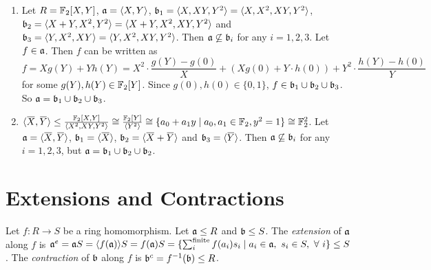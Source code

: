 \begin{example}
    \begin{enumerate}
        \item Let $R = \mathbb{F}_2[X,Y]$, $\mathfrak{a} = \langle X,Y \rangle$, $\mathfrak{b}_1 = \langle X,XY,Y^2 \rangle = \langle X,X^2,XY,Y^2 \rangle$, $\mathfrak{b}_2 = \langle X+Y,X^2,Y^2 \rangle = \langle X+Y,X^2,XY,Y^2 \rangle$ and $\mathfrak{b}_3 = \langle Y,X^2,XY \rangle = \langle Y,X^2,XY,Y^2 \rangle$. Then $\mathfrak{a} \not \subseteq \mathfrak{b}_i$ for any $i = 1,2,3$. Let $f \in \mathfrak{a}$. Then $f$ can be written as 
            \[f = X g(Y) + Y h(Y) = X^2 \cdot \frac{g(Y)-g(0)}{X} + (Xg(0)+Y \cdot h(0)) + Y^2 \cdot \frac{h(Y)-h(0)}{Y} \]
            for some $g(Y),h(Y) \in \mathbb{F}_2[Y]$. Since $g(0), h(0) \in \{0,1\}$, $f \in \mathfrak{b}_1 \cup \mathfrak{b}_2 \cup \mathfrak{b}_3$. So $\mathfrak{a} = \mathfrak{b}_1 \cup \mathfrak{b}_2 \cup \mathfrak{b}_3$.
        \item $ \langle \overbar X, \overbar Y \rangle \leq \frac{\bbF_2[X,Y]}{\langle X^2,XY,Y^2 \rangle} \cong \frac{\bbF_2[Y]}{\langle Y^2 \rangle} \cong \{a_0 + a_1y \mid a_0,a_1 \in \bbF_2, y^2 = 1\} \cong \bbF_2^2$. Let $\ffa = \langle \overbar X,\overbar Y \rangle$, $\ffb_1 = \langle \overbar X \rangle$, $\ffb_2 = \langle \overbar X + \overbar Y \rangle$ and $\ffb_3 = \langle \overbar Y \rangle$. Then $\mathfrak{a} \not \subseteq \mathfrak{b}_i$ for any $i = 1,2,3$, but $\mathfrak{a} = \mathfrak{b}_1 \cup \mathfrak{b}_2 \cup \mathfrak{b}_2$.
    \end{enumerate}
\end{example}

\section*{Extensions and Contractions}

\begin{definition}
    Let $f: R \to S$ be a ring homomorphism. Let $\mathfrak{a} \leq R$ and $\mathfrak{b} \leq S$. The \emph{extension} of $\mathfrak{a}$ along $f$ is $\ffa^e = \ffa S = \langle f(\ffa) \rangle S  = f(\ffa)S = \{\sum_i^{\text{finite}} f(a_i)s_i \mid a_i \in \ffa,\ s_i \in S, \fa i\} \leq S$. The \emph{contraction} of $\mathfrak{b}$ along $f$ is $\mathfrak{b}^c = f^{-1}(\mathfrak{b}) \leq R$.
\end{definition}

